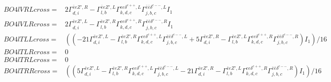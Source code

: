 \documentclass[A4,landscape]{article}
\begin{document}
\begin{align}
  BO4lVRLcross= & 2  \Gamma^{\bar{e}e {Z'} ,R}_{d, i} - \Gamma^{\bar{e}e {Z'} ,L} _{l, b} \Gamma^{e e \delta^{c++},L}_{k, d, c} \Gamma^{\bar{e}\bar{e}\delta^{c--} ,L}_{j, b, c} I_1 \\ 
  BO4lVLRcross= & 2  \Gamma^{\bar{e}e {Z'} ,L}_{d, i} - \Gamma^{\bar{e}e {Z'} ,R} _{l, b} \Gamma^{e e \delta^{c++},R}_{k, d, c} \Gamma^{\bar{e}\bar{e}\delta^{c--} ,R}_{j, b, c} I_1 \\ 
  BO4lTLLcross= & ( (-21 \Gamma^{\bar{e}e {Z'} ,L}_{d, i} - \Gamma^{\bar{e}e {Z'} ,R} _{l, b} \Gamma^{e e \delta^{c++},L}_{k, d, c} \Gamma^{\bar{e}\bar{e}\delta^{c--} ,L}_{j, b, c} + 5 \Gamma^{\bar{e}e {Z'} ,R}_{d, i} - \Gamma^{\bar{e}e {Z'} ,L} _{l, b} \Gamma^{e e \delta^{c++},R}_{k, d, c} \Gamma^{\bar{e}\bar{e}\delta^{c--} ,R}_{j, b, c}) I_1)/16 \\ 
  BO4lTLRcross= & 0 \\ 
  BO4lTRLcross= & 0 \\ 
  BO4lTRRcross= & ( (5 \Gamma^{\bar{e}e {Z'} ,L}_{d, i} - \Gamma^{\bar{e}e {Z'} ,R} _{l, b} \Gamma^{e e \delta^{c++},L}_{k, d, c} \Gamma^{\bar{e}\bar{e}\delta^{c--} ,L}_{j, b, c} - 21 \Gamma^{\bar{e}e {Z'} ,R}_{d, i} - \Gamma^{\bar{e}e {Z'} ,L} _{l, b} \Gamma^{e e \delta^{c++},R}_{k, d, c} \Gamma^{\bar{e}\bar{e}\delta^{c--} ,R}_{j, b, c}) I_1)/16 \\ 
\end{align} 
\end{document}
